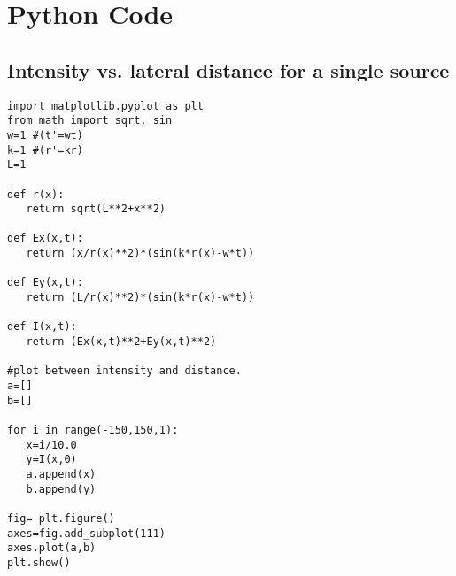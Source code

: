 \chapter{Python Code}

\section{Intensity vs. lateral distance for a single source}\label{code:single}

\begin{Verbatim}[fontsize=\small,baselinestretch=0.9]
import matplotlib.pyplot as plt
from math import sqrt, sin
w=1 #(t'=wt)
k=1 #(r'=kr)
L=1

def r(x):
   return sqrt(L**2+x**2)

def Ex(x,t):
   return (x/r(x)**2)*(sin(k*r(x)-w*t))

def Ey(x,t):
   return (L/r(x)**2)*(sin(k*r(x)-w*t))

def I(x,t):
   return (Ex(x,t)**2+Ey(x,t)**2)

#plot between intensity and distance.
a=[]
b=[]

for i in range(-150,150,1):
   x=i/10.0
   y=I(x,0)
   a.append(x)
   b.append(y)

fig= plt.figure()
axes=fig.add_subplot(111)
axes.plot(a,b)
plt.show()
\end{Verbatim}
